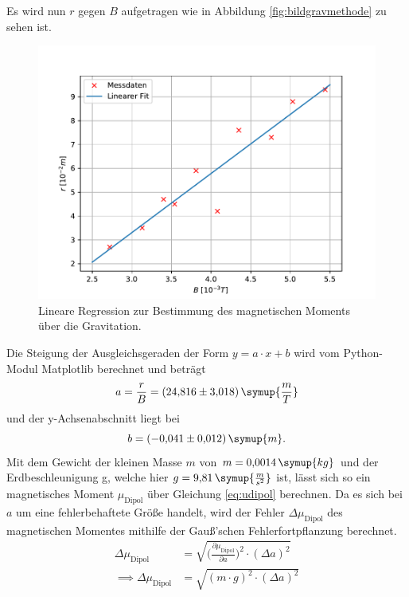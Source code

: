 Es wird nun $r$ gegen $B$ aufgetragen wie in Abbildung \eqref{fig:bildgravmethode} zu sehen ist.
\begin{figure}[h!]
\centering
\includegraphics[scale=.9]{GravMethode.pdf}
\caption{Lineare Regression zur Bestimmung des magnetischen Moments über die Gravitation.}
\label{fig:bildgravmethode}
\end{figure}
Die Steigung der Ausgleichsgeraden der Form $y = a\cdot x + b$ wird vom Python-Modul Matplotlib berechnet und beträgt 
\begin{equation*}
a = \frac {r}{B}= (24{,}816 \pm 3{,}018)\, \symup{\frac{m}{T}}
\end{equation*}
und der y-Achsenabschnitt liegt bei
\begin{equation*}
b = (-0{,}041 \pm 0{,}012)\, \symup{m}.
\end{equation*}
Mit dem Gewicht der kleinen Masse $m$ von $m = 0{,}0014\, \symup{kg}$ und der Erdbeschleunigung g, welche hier 
$g = 9{,}81\, \symup{\frac{m}{s^2}}$ ist, lässt sich so ein magnetisches Moment $\mu_{\text{Dipol}}$ über Gleichung \eqref{eq:udipol} 
berechnen.
Da es sich bei $a$ um eine fehlerbehaftete Größe handelt, wird der Fehler $\Delta{\mu_{\text{Dipol}}}$ des magnetischen Momentes mithilfe der Gauß'schen 
Fehlerfortpflanzung berechnet.
\begin{equation*}
\begin{aligned}
\Delta{\mu_{\text{Dipol}}} &= \sqrt{\biggl(\frac{\partial \mu_{\text{Dipol}}}{\partial a}\biggr)^2 \cdot (\Delta a)^2} \\
\implies \Delta{\mu_{\text{Dipol}}} &= \sqrt{(m \cdot g)^2 \cdot (\Delta a)^2} \\
\end{aligned}
\end{equation*}

